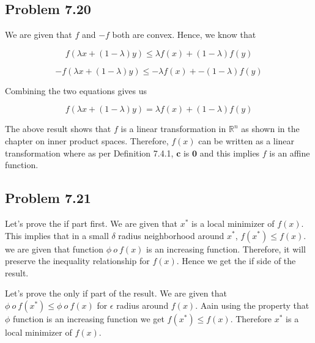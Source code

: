 \documentclass[letterpaper,12pt]{article}
\theoremstyle{definition}
\begin{document}
\subsection*{Problem 7.20}

We are given that $f$ and $-f$ both are convex. Hence, we know that

\begin{equation*}
    f(\lambda x + (1-\lambda) y) \leq \lambda f(x) + (1-\lambda)f(y)
\end{equation*}

\begin{equation*}
    -f(\lambda x + (1-\lambda) y) \leq -\lambda f(x) + -(1-\lambda)f(y)
\end{equation*}
\begin{flushleft}
Combining the two equations gives us 
\end{flushleft}
\begin{equation*}
    f(\lambda x + (1-\lambda) y) = \lambda f(x) + (1-\lambda)f(y)
\end{equation*}
\begin{flushleft}
The above result shows that $f$ is a linear transformation in $\mathbb{R}^n$ as shown in the chapter on inner product spaces. Therefore, $f(x)$ can be written as a linear transformation where as per Definition 7.4.1, $\textbf{c}$ is $\textbf{0}$ and this implies $f$ is an affine function.
\end{flushleft}

\subsection*{Problem 7.21}

Let's prove the if part first. We are given that $x^*$ is a local minimizer of $f(x)$. This implies that in a small $\delta$ radius neighborhood around $x^*$, $f(x^*) \leq f(x) $. we are given that function $\phi \ o \ f(x) $ is an increasing function. Therefore, it will preserve the inequality relationship for $f(x)$. Hence we get the if side of the result.\\

\begin{flushleft}
Let's prove the only if part of the result. We are given that $\phi \ o \ f(x^*) \leq  \phi \ o \ f(x)$ for $\epsilon$ radius around $f(x)$. Aain using the property that $\phi$ function is an increasing function we get $f(x^*) \leq f(x) $. Therefore $x^*$ is a local minimizer of $f(x)$.

\end{flushleft}
\end{document}
